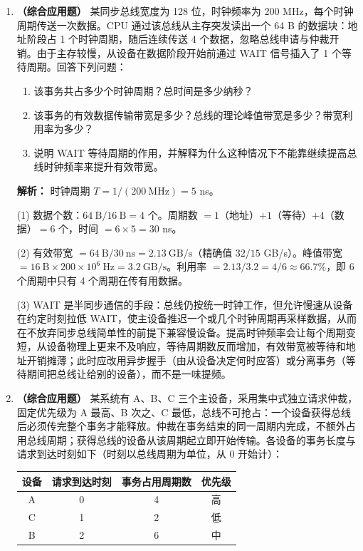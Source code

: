 \begin{enumerate}[resume]
\item \textbf{（综合应用题）} 某同步总线宽度为 128 位，时钟频率为 200 MHz，每个时钟周期传送一次数据。CPU 通过该总线从主存突发读出一个 64 B 的数据块：地址阶段占 1 个时钟周期，随后连续传送 4 个数据，忽略总线申请与仲裁开销。由于主存较慢，从设备在数据阶段开始前通过 WAIT 信号插入了 1 个等待周期。回答下列问题：

\begin{enumerate}
\item[(1)] 该事务共占多少个时钟周期？总时间是多少纳秒？
\item[(2)] 该事务的有效数据传输带宽是多少？总线的理论峰值带宽是多少？带宽利用率为多少？
\item[(3)] 说明 WAIT 等待周期的作用，并解释为什么这种情况下不能靠继续提高总线时钟频率来提升有效带宽。
\end{enumerate}

\ifshowsolutions\par\noindent\textbf{解析：} 时钟周期 $T=1/(200\ \text{MHz})=5$ ns。

(1) 数据个数：$64\ \text{B}/16\ \text{B}=4$ 个。周期数 $=1$（地址）$+1$（等待）$+4$（数据）$=6$ 个，时间 $=6\times5=30$ ns。

(2) 有效带宽 $=64\ \text{B}/30\ \text{ns}=2.13\ \text{GB/s}$（精确值 $32/15$ GB/s）。峰值带宽 $=16\ \text{B}\times200\times10^{6}\ \text{Hz}=3.2\ \text{GB/s}$。利用率 $=2.13/3.2=4/6\approx66.7\%$，即 6 个周期中只有 4 个周期在传有用数据。

(3) WAIT 是半同步通信的手段：总线仍按统一时钟工作，但允许慢速从设备在约定时刻拉低 WAIT，使主设备推迟一个或几个时钟周期再采样数据，从而在不放弃同步总线简单性的前提下兼容慢设备。提高时钟频率会让每个周期变短，从设备物理上更来不及响应，等待周期数反而增加，有效带宽被等待和地址开销摊薄；此时应改用异步握手（由从设备决定何时应答）或分离事务（等待期间把总线让给别的设备），而不是一味提频。\else \answerarea[8] \fi

\item \textbf{（综合应用题）} 某系统有 A、B、C 三个主设备，采用集中式独立请求仲裁，固定优先级为 A 最高、B 次之、C 最低，总线不可抢占：一个设备获得总线后必须传完整个事务才能释放。仲裁在事务结束的同一周期内完成，不额外占用总线周期；获得总线的设备从该周期起立即开始传输。各设备的事务长度与请求到达时刻如下（时刻以总线周期为单位，从 0 开始计）：

\nopagebreak[4]
\begin{center}
\begin{tabular}{cccc}
\toprule
设备 & 请求到达时刻 & 事务占用周期数 & 优先级 \\
\midrule
A & 0 & 4 & 高 \\
C & 1 & 2 & 低 \\
B & 2 & 6 & 中 \\
\bottomrule
\end{tabular}
\end{center}


\end{enumerate}
